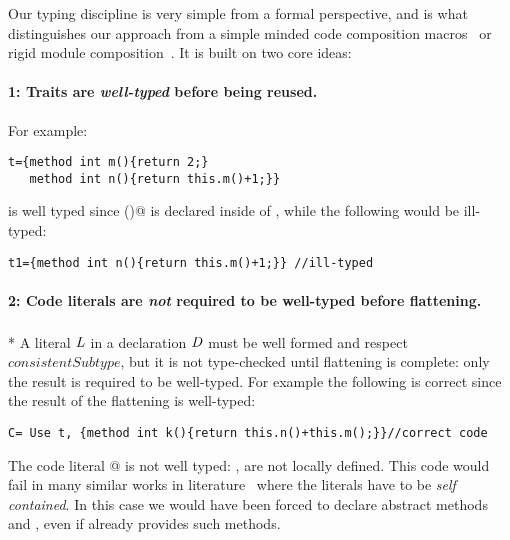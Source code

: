 Our typing discipline is very simple from a formal perspective,  
and is what distinguishes our approach from a simple minded code composition macros~\cite{bawden1999quasiquotation}
or rigid module composition~\cite{ancona2002calculus}. 
It is built on two core ideas:

\paragraph{1: Traits are \emph{well-typed} before being reused.}
 For example:

\saveSpace\saveSpace\begin{lstlisting}
t={method int m(){return 2;} 
   method int n(){return this.m()+1;}}
\end{lstlisting}\saveSpace\saveSpace

\noindent \Q@t@ is well typed since \Q@m()@ is declared inside of \Q@t@, while the following would be ill-typed:

\saveSpace\saveSpace\begin{lstlisting}
t1={method int n(){return this.m()+1;}} //ill-typed
\end{lstlisting}\saveSpace\saveSpace


\paragraph{2: Code literals are \emph{not} required to be well-typed before flattening.}${}_{}$\\*
A literal $\mathit{L}$ in a declaration $\mathit{D}$
must be well formed and respect
$\mathit{consistentSubtype}$, but
it is not type-checked until flattening is complete:
only the result is required to be well-typed.
For example the following is correct since
the result of the flattening is well-typed:

\saveSpace\saveSpace\begin{lstlisting}
C= Use t, {method int k(){return this.n()+this.m();}}//correct code
\end{lstlisting}\saveSpace\saveSpace

\noindent The code literal
@
is not well typed: \Q@n@, \Q@m@ are not locally defined.
This code would fail in many similar works in literature~\cite{deep,Bettini2015282,Bergel2007} where the
literals have to be \emph{self contained}. In this case we would have been forced to
declare abstract methods \Q@n@ and \Q@m@, even if \Q@t@ already 
provides such methods.


